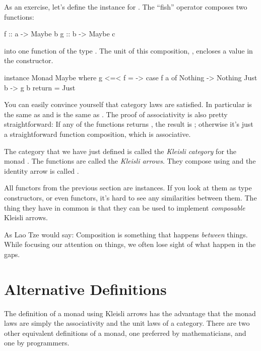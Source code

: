 \documentclass[DaoFP]{subfiles}
\begin{document}
As an exercise, let's define the  instance for . The ``fish'' operator \hask{<=<} composes two functions:
\begin{haskell}
f :: a -> Maybe b
g :: b -> Maybe c
\end{haskell}
into one function of the type . The unit of this composition, , encloses a value in the  constructor.
\begin{haskell}
instance Monad Maybe where
  g <=< f = \a -> case f a of
                    Nothing -> Nothing
                    Just b -> g b
  return = Just  
\end{haskell}

You can easily convince yourself that category laws are satisfied. In particular  is the same as  and  is the same as . The proof of associativity is also pretty straightforward: If any of the functions returns , the result is ; otherwise it's just a straightforward function composition, which is associative.

The category that we have just defined is called the \emph{Kleisli category} for the monad . The functions  are called the \emph{Kleisli arrows}. They compose using \hask{<=<} and the identity arrow is called .

All functors from the previous section are  instances. If you look at them as type constructors, or even functors, it's hard to see any similarities between them. The thing they have in common is that they can be used to implement \emph{composable} Kleisli arrows. 

As Lao Tze would say: Composition is something that happens \emph{between} things. While focusing our attention on things, we often lose sight of what happen in the gaps. 

\section{Alternative Definitions}

The definition of a monad using Kleisli arrows has the advantage that the monad laws are simply the associativity and the unit laws of a category. There are two other equivalent definitions of a monad, one preferred by mathematicians, and one by programmers. 
\end{document}
